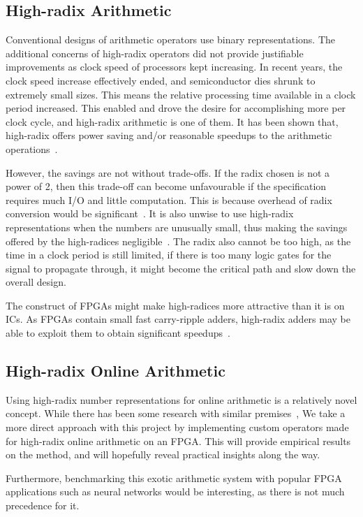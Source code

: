 \subsection{High-radix Arithmetic}
Conventional designs of arithmetic operators use binary representations.
The additional concerns of high-radix operators did not provide justifiable improvements as clock speed of processors kept increasing.
In recent years, the clock speed increase effectively ended, and semiconductor dies shrunk to extremely small sizes.
This means the relative processing time available in a clock period increased.
This enabled and drove the desire for accomplishing more per clock cycle, and high-radix arithmetic is one of them.
It has been shown that, high-radix offers power saving and/or reasonable speedups to the arithmetic operations~\cite{Catanzaro1}\cite{Amin1}\cite{Chen1}.

However, the savings are not without trade-offs.
If the radix chosen is not a power of 2, then this trade-off can become unfavourable if the specification requires much I/O and little computation.
This is because overhead of radix conversion would be significant~\cite{Whyte1}.
It is also unwise to use high-radix representations when the numbers are unusually small, thus making the savings offered by the high-radices negligible~\cite{Catanzaro1}.
The radix also cannot be too high, as the time in a clock period is still limited, if there is too many logic gates for the signal to propagate through, it might become the critical path and slow down the overall design.

The construct of FPGAs might make high-radices more attractive than it is on ICs.
As FPGAs contain small fast carry-ripple adders, high-radix adders may be able to exploit them to obtain significant speedups~\cite{Kornerup1}.

\subsection{High-radix Online Arithmetic}
Using high-radix number representations for online arithmetic is a relatively novel concept.
While there has been some research with similar premises~\cite{Lynch1}\cite{Lynch2}, We take a more direct approach with this project by implementing custom operators made for high-radix online arithmetic on an FPGA.
This will provide empirical results on the method, and will hopefully reveal practical insights along the way.

Furthermore, benchmarking this exotic arithmetic system with popular FPGA applications such as neural networks would be interesting, as there is not much precedence for it.

